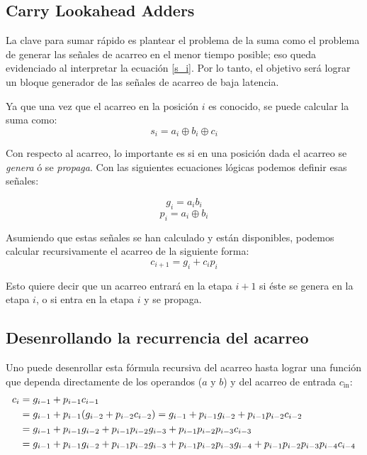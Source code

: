 
\subsection{Carry Lookahead Adders}

La clave para sumar rápido es plantear el problema de la suma como el problema de generar las señales de acarreo en el menor tiempo posible; eso queda evidenciado al interpretar la ecuación \ref{s_i}. Por lo tanto, el objetivo será lograr un bloque generador de las señales de acarreo de baja latencia\cite{arithmeticComputer}.

Ya que una vez que el acarreo en la posición \(i\) es conocido, se puede calcular la suma como:
\begin{equation}\label{s_i}
s_i = a_i \oplus b_i\oplus c_i
\end{equation}

Con respecto al acarreo, lo importante es si en una posición dada el acarreo se \emph{genera} ó se \emph{propaga}. Con las siguientes ecuaciones lógicas podemos definir esas señales:
%

$$g_i=a_ib_i$$
$$p_i=a_i \oplus b_i$$


Asumiendo que estas señales se han calculado y están disponibles, podemos calcular recursivamente el acarreo de la siguiente forma:
\begin{equation}
c_{i+1}=g_i + c_i p_i
\end{equation}


\noindent Esto quiere decir que un acarreo entrará en la etapa \(i+1\) si éste se genera en la etapa \(i\), o si entra en la etapa \(i\) y se propaga.

\subsection{Desenrollando la recurrencia del acarreo}
Uno puede desenrollar esta fórmula recursiva del acarreo hasta lograr una función que dependa directamente de los operandos ($a$ y $b$) y del acarreo de entrada $c_{\text{in}}$:
\begin{equation}
\begin{align}
c_i &= g_{i-1} + p_{i-1}c_{i-1}\notag\\
&=g_{i-1}+p_{i-1}(g_{i-2}+p_{i-2}c_{i-2})=g_{i-1}+p_{i-1}g_{i-2}+p_{i-1}p_{i-2}c_{i-2}\notag\\
&=g_{i-1} + p_{i-1}g_{i-2}+p_{i-1}p_{i-2}g_{i-3}+p_{i-1}p_{i-2}p_{i-3}c_{i-3}\notag\\
&=g_{i-1} +p_{i-1}g_{i-2}+p_{i-1}p_{i-2}g_{i-3}+p_{i-1}p_{i-2}p_{i-3}g_{i-4}+p_{i-1}p_{i-2}p_{i-3}p_{i-4}c_{i-4}\label{gyp}	
\end{align}
\end{equation}

